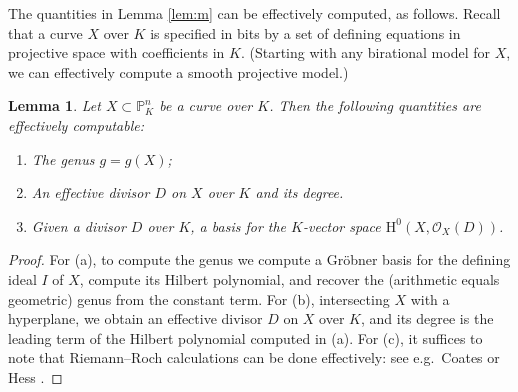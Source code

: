 \documentclass{amsproc}
\numberwithin{equation}{section}
\numberwithin{figure}{section}
\newtheorem{lemma}[equation]{Lemma}
\theoremstyle{definition}
\theoremstyle{remark}
\newenvironment{enumroman}
{\begin{enumerate}\renewcommand{\labelenumi}{\textnormal{(\roman{enumi})}}}
{\end{enumerate}}
\newcommand{\scrL}{\mathscr{L}}
\newcommand\PP{\mathbb{P}}
\newcommand\scrO{\mathscr{O}}
\newcommand\Hzero{\mathrm{H}^0}
\renewcommand{\leq}{\leqslant}
\renewcommand{\geq}{\geqslant}
\begin{document}
The quantities in Lemma \ref{lem:m} can be effectively computed, as follows.  Recall that a curve $X$ over $K$ is specified in bits by a set of defining equations in projective space with coefficients in $K$.  (Starting with any birational model for $X$, we can effectively compute a smooth projective model.)

\begin{lemma}\label{lem:m2}
Let $X \subset \PP_K^n$ be a curve over $K$.  Then the following quantities are effectively computable:
\begin{enumroman}
\item The genus $g=g(X)$;
\item An effective divisor $D$ on $X$ over $K$ and its degree.
\item Given a divisor $D$ over $K$, a basis for the $K$-vector space $\Hzero(X,\scrO_X(D))$.
\end{enumroman}
\end{lemma}

\begin{proof}
For (a), to compute the genus we compute a Gr\"obner basis for the defining ideal $I$ of $X$, compute its Hilbert polynomial, and recover the (arithmetic equals geometric) genus from the constant term.  For (b), intersecting $X$ with a hyperplane, we obtain an effective divisor $D$ on $X$ over $K$, and its degree is the leading term of the Hilbert polynomial computed in (a).
For (c), it suffices to note that Riemann--Roch calculations can be done effectively: see e.g.\ Coates \cite{Coates} or Hess \cite{Hess}.
\end{proof} 
\end{document}
